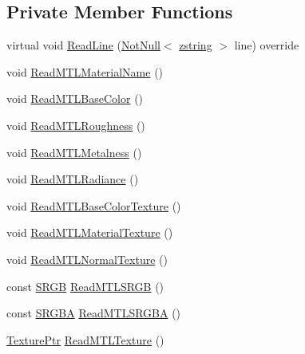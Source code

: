 \subsection*{Private Member Functions}
\begin{DoxyCompactItemize}
\item 
virtual void \hyperlink{classmage_1_1rendering_1_1loader_1_1_m_t_l_reader_a54eb83757c915ebca73175e83737cf73}{Read\+Line} (\hyperlink{namespacemage_a8769f9d670d6b585ea306cb1062af94b}{Not\+Null}$<$ \hyperlink{namespacemage_a4163ec9a9a27d5e7f4b452dcb99cb2b9}{zstring} $>$ line) override
\item 
void \hyperlink{classmage_1_1rendering_1_1loader_1_1_m_t_l_reader_ab123422945f5937ffe484c1076a6858b}{Read\+M\+T\+L\+Material\+Name} ()
\item 
void \hyperlink{classmage_1_1rendering_1_1loader_1_1_m_t_l_reader_ae228231b40bc5b8a6fdff3a9a5698530}{Read\+M\+T\+L\+Base\+Color} ()
\item 
void \hyperlink{classmage_1_1rendering_1_1loader_1_1_m_t_l_reader_a01438c92852592fd719a85d146e38b65}{Read\+M\+T\+L\+Roughness} ()
\item 
void \hyperlink{classmage_1_1rendering_1_1loader_1_1_m_t_l_reader_a14aa8cd5655730234c460c6060552f68}{Read\+M\+T\+L\+Metalness} ()
\item 
void \hyperlink{classmage_1_1rendering_1_1loader_1_1_m_t_l_reader_acfafc2485c4b84ef84360e35ac8247eb}{Read\+M\+T\+L\+Radiance} ()
\item 
void \hyperlink{classmage_1_1rendering_1_1loader_1_1_m_t_l_reader_a67198ee5158ee7d77e907f6538030aee}{Read\+M\+T\+L\+Base\+Color\+Texture} ()
\item 
void \hyperlink{classmage_1_1rendering_1_1loader_1_1_m_t_l_reader_a62b4c2d4106fb11f55af6a7de29ad37a}{Read\+M\+T\+L\+Material\+Texture} ()
\item 
void \hyperlink{classmage_1_1rendering_1_1loader_1_1_m_t_l_reader_afc25c8d259af6fbeb06a1e189f247e75}{Read\+M\+T\+L\+Normal\+Texture} ()
\item 
const \hyperlink{structmage_1_1_s_r_g_b}{S\+R\+GB} \hyperlink{classmage_1_1rendering_1_1loader_1_1_m_t_l_reader_aaefa7c67f90d7d592366acdb898993b3}{Read\+M\+T\+L\+S\+R\+GB} ()
\item 
const \hyperlink{structmage_1_1_s_r_g_b_a}{S\+R\+G\+BA} \hyperlink{classmage_1_1rendering_1_1loader_1_1_m_t_l_reader_a5b03c5c7aee393e60ea6c3bd7ff15614}{Read\+M\+T\+L\+S\+R\+G\+BA} ()
\item 
\hyperlink{namespacemage_1_1rendering_a6f3ae54f825328465b0cdde0f0de4a36}{Texture\+Ptr} \hyperlink{classmage_1_1rendering_1_1loader_1_1_m_t_l_reader_abf1609fbd22075fa4e692b7b6eab06fd}{Read\+M\+T\+L\+Texture} ()
\end{DoxyCompactItemize}
